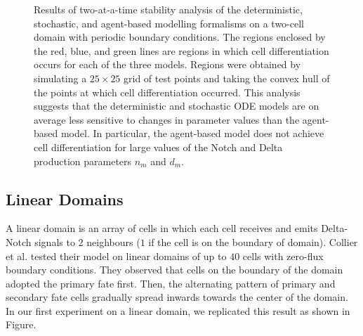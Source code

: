 \documentclass{article}
\begin{document}
\begin{flushleft}
\begin{figure}[!htp]
   \caption{Results of two-at-a-time stability analysis of the deterministic, stochastic, and agent-based modelling formalisms on a two-cell domain with periodic boundary conditions. The regions enclosed by the red, blue, and green lines are regions in which cell differentiation occurs for each of the three models. Regions were obtained by simulating a $25 \times 25$ grid of test points and taking the convex hull of the points at which cell differentiation occurred. This analysis suggests that the deterministic and stochastic ODE models are on average less sensitive to changes in parameter values than the agent-based model. In particular, the agent-based model does not achieve cell differentiation for large values of the Notch and Delta production parameters $n_{m}$ and $d_{m}$.} 
   \label{fig:stability-analysis}
\end{figure}

\subsection*{Linear Domains}

A linear domain is an array of cells in which each cell receives and emits Delta-Notch signals to $2$ neighbours ($1$ if the cell is on the boundary of domain).
Collier et al. \cite{collier_pattern_1996} tested their model on linear domains of up to $40$ cells with zero-flux boundary conditions.
They observed that cells on the boundary of the domain adopted the primary fate first.
Then, the alternating pattern of primary and secondary fate cells gradually spread inwards towards the center of the domain.
In our first experiment on a linear domain, we replicated this result as shown in Figure.


\end{flushleft}
\end{document}
